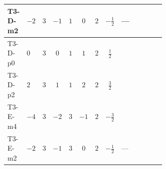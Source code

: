 \documentclass[8pt]{article}
\begin{document}
\begin{landscape}
\begin{longtable}{@{}llcccccc >{\raggedright\arraybackslash}p{0.21\linewidth} >{\raggedright\arraybackslash}p{0.21\linewidth} >{\raggedright\arraybackslash}p{0.21\linewidth}@{}}
\midrule
T3-D-m2 & $-2$ & $3$ & $-1$ & $1$ & $0$ & $2$ & $-\frac{1}{2}$ & --- & \scriptsize\adjustbox{max width=\linewidth}{$\begin{gathered} +6 {\lambda_{12}^{(1)}}^2\end{gathered}$} & \scriptsize\adjustbox{max width=\linewidth}{$\begin{gathered} +4 {\lambda_{HS_2}^{(1)}}^2\end{gathered}$} \\
\midrule
T3-D-p0 & $0$ & $3$ & $0$ & $1$ & $1$ & $2$ & $\frac{1}{2}$ & \scriptsize\adjustbox{max width=\linewidth}{$\begin{gathered} +12 {g_1}^4\end{gathered}$} & \scriptsize\adjustbox{max width=\linewidth}{$\begin{gathered} +6 {\lambda_{12}^{(1)}}^2\end{gathered}$} & \scriptsize\adjustbox{max width=\linewidth}{$\begin{gathered} +4 {\lambda_{HS_2}^{(1)}}^2\end{gathered}$} \\
\midrule
T3-D-p2 & $2$ & $3$ & $1$ & $1$ & $2$ & $2$ & $\frac{3}{2}$ & \scriptsize\adjustbox{max width=\linewidth}{$\begin{gathered} +192 {g_1}^4\end{gathered}$} & \scriptsize\adjustbox{max width=\linewidth}{$\begin{gathered} +6 {\lambda_{12}^{(1)}}^2\end{gathered}$} & \scriptsize\adjustbox{max width=\linewidth}{$\begin{gathered} +4 {\lambda_{HS_2}^{(1)}}^2\end{gathered}$} \\
\midrule
T3-E-m4 & $-4$ & $3$ & $-2$ & $3$ & $-1$ & $2$ & $-\frac{3}{2}$ & \scriptsize\adjustbox{max width=\linewidth}{$\begin{gathered} +12 {g_1}^4\end{gathered}$} & \scriptsize\adjustbox{max width=\linewidth}{$\begin{gathered} +6 {\lambda_{12}^{(1)}}^2\end{gathered}$} & \scriptsize\adjustbox{max width=\linewidth}{$\begin{gathered} +4 {\lambda_{HS_2}^{(1)}}^2\end{gathered}$} \\
\midrule
T3-E-m2 & $-2$ & $3$ & $-1$ & $3$ & $0$ & $2$ & $-\frac{1}{2}$ & --- & \scriptsize\adjustbox{max width=\linewidth}{$\begin{gathered} +6 {\lambda_{12}^{(1)}}^2\end{gathered}$} & \scriptsize\adjustbox{max width=\linewidth}{$\begin{gathered} +4 {\lambda_{HS_2}^{(1)}}^2\end{gathered}$} \\

\end{longtable}
\end{landscape}
\end{document}
